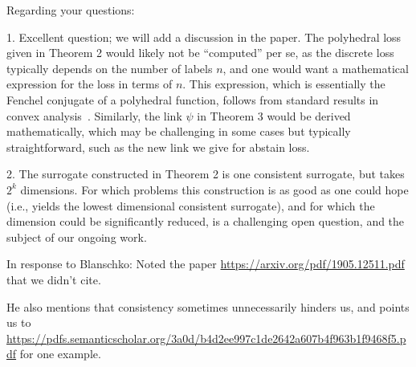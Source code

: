 \documentclass{article}
\begin{document}
Regarding your questions:

1. Excellent question; we will add a discussion in the paper.
The polyhedral loss given in Theorem 2 would likely not be ``computed'' per se, as the discrete loss typically depends on the number of labels $n$, and one would want a mathematical expression for the loss in terms of $n$.
This expression, which is essentially the Fenchel conjugate of a polyhedral function, follows from standard results in convex analysis~\cite[Thm 19.1, Thm 19.2]{rockafellar1997convex}.
Similarly, the link $\psi$ in Theorem 3 would be derived mathematically, which may be challenging in some cases but typically straightforward, such as the new link we give for abstain loss.

2.
The surrogate constructed in Theorem 2 is one consistent surrogate, but takes $2^k$ dimensions.
For which problems this construction is as good as one could hope (i.e., yields the lowest dimensional consistent surrogate), and for which the dimension could be significantly reduced, is a challenging open question, and the subject of our ongoing work.

\hline
In response to Blanschko:
Noted the paper \url{https://arxiv.org/pdf/1905.12511.pdf} that we didn't cite.

He also mentions that consistency sometimes unnecessarily hinders us, and points us to \url{https://pdfs.semanticscholar.org/3a0d/b4d2ee997c1de2642a607b4f963b1f9468f5.pdf} for one example.



\end{document}
